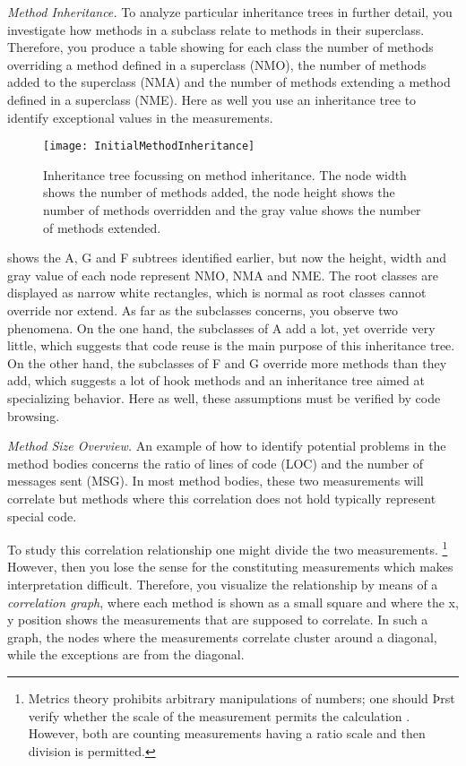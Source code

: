 \documentclass[a4paper,10pt,twoside]{book}
\begin{document}
\noindent
\emph{Method Inheritance.}
To analyze particular inheritance trees in further detail, you investigate how methods in a 
subclass relate to methods in their superclass. Therefore, you produce a table showing for 
each class the number of methods overriding a method defined in a superclass (NMO), the 
number of methods added to the superclass (NMA) and the number of methods extending a 
method defined in a superclass (NME). Here as well you use an inheritance tree to identify 
exceptional values in the measurements.

\begin{figure}
\begin{center}
\texttt{[image: InitialMethodInheritance]}
\caption{Inheritance tree focussing on method inheritance. The node width shows the number 
of methods added, the node height shows the number of methods overridden and the gray value 
shows the number of methods extended.}
\end{center}
\end{figure}

 shows the A, G and F subtrees identified earlier, but now 
the height, width and gray value of each node represent NMO, NMA and NME. The root classes 
are displayed as narrow white rectangles, which is normal as root classes cannot override 
nor extend. As far as the subclasses concerns, you observe two phenomena. On the one hand, 
the subclasses of A add a lot, yet override very little, which suggests that code reuse is 
the main purpose of this inheritance tree. On the other hand, the subclasses of F and G 
override more methods than they add, which suggests a lot of hook methods and an 
inheritance tree aimed at specializing behavior. Here as well, these assumptions must be 
verified by code browsing. 

\noindent
\emph{Method Size Overview.}
An example of how to identify potential problems in the method bodies concerns the ratio of 
lines of code (LOC) and the number of messages sent (MSG). In most method bodies, these two 
measurements will correlate but methods where this correlation does not hold typically 
represent special code.

To study this correlation relationship one might divide the two measurements.
\footnote{Metrics theory prohibits arbitrary manipulations of numbers; one should Þrst 
verify whether the scale of the measurement permits the calculation \cite{Fent96a}. 
However, both are counting measurements having a ratio scale and then division is 
permitted.} However, then you lose the sense for the constituting measurements which makes 
interpretation difficult. Therefore, you visualize the relationship by means of a 
\emph{correlation graph}, where each method is shown as a small square and where the x, y 
position shows the measurements that are supposed to correlate. In such a graph, the nodes 
where the measurements correlate cluster around a diagonal, while the exceptions are from 
the diagonal.
\end{document}

